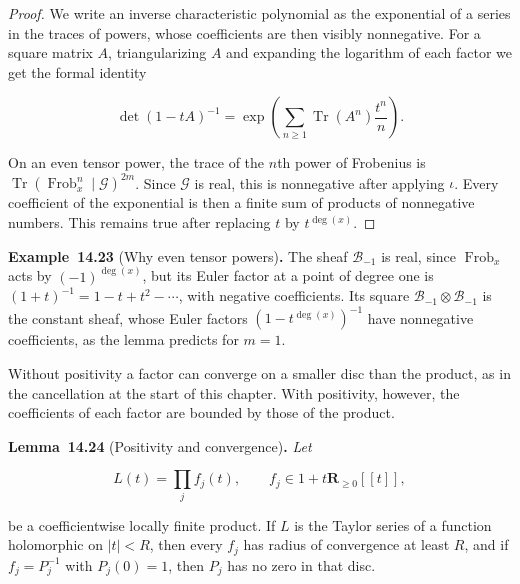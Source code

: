 \documentclass[11pt]{article}
\newenvironment{bpstatement}[2]{\par\addvspace{0.6\baselineskip}\noindent\textbf{#1}#2\textbf{.}\enspace\ignorespaces}
  {\par\addvspace{0.4\baselineskip}}
\newenvironment{bpstatementit}[2]{\begin{bpstatement}{#1}{#2}\itshape\ignorespaces}{\end{bpstatement}}
\begin{document}
\begin{proof}[{Proof}]\label{bp110}%
We write an inverse characteristic polynomial as the exponential of a series in the traces of powers, whose coefficients are then visibly nonnegative. For a square matrix \(A\), triangularizing \(A\) and expanding the logarithm of each factor we get the formal identity

\[
\det(1-tA)^{-1}
=\exp\left(\sum_{n\ge1}\operatorname{Tr}(A^n)\frac{t^n}{n}\right).
\]

On an even tensor power, the trace of the \(n\)th power of Frobenius is \(\operatorname{Tr}(\operatorname{Frob}_x^n\mid\mathcal G)^{2m}\). Since \(\mathcal G\) is real, this is nonnegative after applying \(\iota\).  Every coefficient of the exponential is then a finite sum of products of nonnegative numbers. This remains true after replacing \(t\) by \(t^{\deg(x)}\).
\end{proof}

\label{bp111}%
\begin{bpstatement}{Example~14.23}{ (Why even tensor powers)}
The sheaf \(\mathcal B_{-1}\) is real, since \(\operatorname{Frob}_x\) acts by \((-1)^{\deg(x)}\), but its Euler factor at a point of degree one is \((1+t)^{-1}=1-t+t^2-\cdots\), with negative coefficients. Its square \(\mathcal B_{-1}\otimes\mathcal B_{-1}\) is the constant sheaf, whose Euler factors \((1-t^{\deg(x)})^{-1}\) have nonnegative coefficients, as the lemma predicts for \(m=1\).
\end{bpstatement}

\label{bp112}%
Without positivity a factor can converge on a smaller disc than the product, as in the cancellation at the start of this chapter. With positivity, however, the coefficients of each factor are bounded by those of the product.

\label{bp113}%
\begin{bpstatementit}{Lemma~14.24}{ (Positivity and convergence)}
Let

\[
L(t)=\prod_j f_j(t),\qquad f_j\in1+t\mathbf R_{\ge0}[[t]],
\]

be a coefficientwise locally finite product. If \(L\) is the Taylor series of a function holomorphic on \(|t|<R\), then every \(f_j\) has radius of convergence at least \(R\), and if \(f_j=P_j^{-1}\) with \(P_j(0)=1\), then \(P_j\) has no zero in that disc.
\end{bpstatementit}
\end{document}
